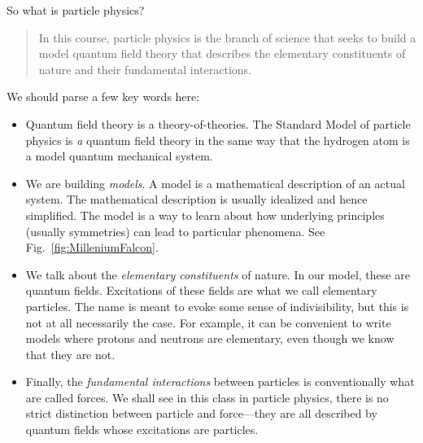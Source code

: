\documentclass[12pt, oneside]{report}    %
\begin{document}
So what is particle physics? \begin{quote}In this course, particle physics is the branch of science that seeks to build a model quantum field theory that describes the elementary constituents of nature and their fundamental interactions.\end{quote} We should parse a few key words here:
\begin{itemize}
    \item Quantum field theory is a theory-of-theories. The Standard Model of particle physics is \emph{a} quantum field theory in the same way that the hydrogen atom is a model quantum mechanical system. 
    \item We are building \emph{models}. A model is a mathematical description of an actual system. The mathematical description is usually idealized and hence simplified. The model is a way to learn about how underlying principles (usually symmetries) can lead to particular phenomena. See Fig.~\ref{fig:MilleniumFalcon}.
    \item We talk about the \emph{elementary constituents} of nature. In our model, these are quantum fields. Excitations of these fields are what we call elementary particles. The name is meant to evoke some sense of indivisibility, but this is not at all necessarily the case. For example, it can be convenient to write models where protons and neutrons are elementary, even though we know that they are not. 
    \item Finally, the \emph{fundamental interactions} between particles is conventionally what are called forces. We shall see in this class in particle physics, there is no strict distinction between particle and force---they are all described by quantum fields whose excitations are particles. 
\end{itemize}
\end{document}
